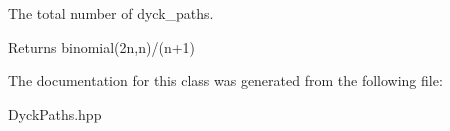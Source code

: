 The total number of dyck\-\_\-paths. 

\begin{DoxyReturn}{Returns}
binomial(2n,n)/(n+1) 
\end{DoxyReturn}


The documentation for this class was generated from the following file\-:\begin{DoxyCompactItemize}
\item 
Dyck\-Paths.\-hpp\end{DoxyCompactItemize}

